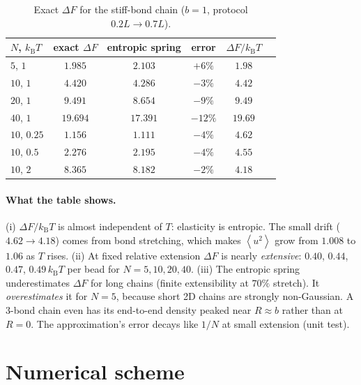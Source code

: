 \documentclass[11pt,a4paper]{article}
\newcommand{\kT}{k_{\mathrm B}T}
\newcommand{\avg}[1]{\left\langle #1\right\rangle}
\begin{document}
\begin{table}[h]
\centering\small
\begin{tabular}{lccccc}
\toprule
$N$, $\kT$ & exact $\Delta F$ & entropic spring & error & $\Delta F/\kT$\\
\midrule
$5$, $1$ & $1.985$ & $2.103$ & $+6\%$ & $1.98$\\
$10$, $1$ & $4.420$ & $4.286$ & $-3\%$ & $4.42$\\
$20$, $1$ & $9.491$ & $8.654$ & $-9\%$ & $9.49$\\
$40$, $1$ & $19.694$ & $17.391$ & $-12\%$ & $19.69$\\
\midrule
$10$, $0.25$ & $1.156$ & $1.111$ & $-4\%$ & $4.62$\\
$10$, $0.5$ & $2.276$ & $2.195$ & $-4\%$ & $4.55$\\
$10$, $2$ & $8.365$ & $8.182$ & $-2\%$ & $4.18$\\
\bottomrule
\end{tabular}
\caption{Exact $\Delta F$ for the stiff-bond chain ($b=1$, protocol $0.2L\to0.7L$).}
\label{tab:dF}
\end{table}

\paragraph{What the table shows.}
(i) $\Delta F/\kT$ is almost independent of $T$: elasticity is entropic. The small
drift ($4.62\to4.18$) comes from bond stretching, which makes $\avg{u^2}$ grow from $1.008$ to
$1.06$ as $T$ rises. (ii) At fixed relative extension $\Delta F$ is nearly
\emph{extensive}: $0.40$, $0.44$, $0.47$, $0.49\,\kT$ per bead for $N=5,10,20,40$. (iii) The entropic spring underestimates $\Delta F$ for long chains (finite
extensibility at $70\%$ stretch). It \emph{overestimates} it for $N=5$, because short 2D chains
are strongly non-Gaussian. A 3-bond chain even has its end-to-end density peaked near $R\approx b$ rather
than at $R=0$. The approximation's error decays like $1/N$ at small extension (unit test).

\section{Numerical scheme}
\label{sec:numerics}
\end{document}
